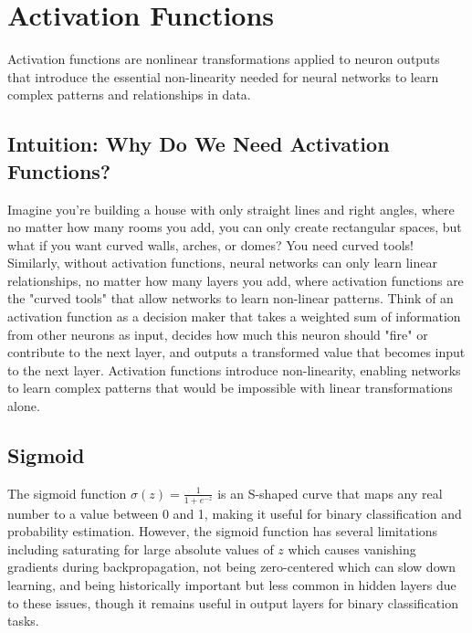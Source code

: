 
\section{Activation Functions }
\label{sec:activation-functions}

Activation functions are nonlinear transformations applied to neuron outputs that introduce the essential non-linearity needed for neural networks to learn complex patterns and relationships in data.

\subsection{Intuition: Why Do We Need Activation Functions?}

Imagine you're building a house with only straight lines and right angles, where no matter how many rooms you add, you can only create rectangular spaces, but what if you want curved walls, arches, or domes? You need curved tools! Similarly, without activation functions, neural networks can only learn linear relationships, no matter how many layers you add, where activation functions are the "curved tools" that allow networks to learn non-linear patterns. Think of an activation function as a decision maker that takes a weighted sum of information from other neurons as input, decides how much this neuron should "fire" or contribute to the next layer, and outputs a transformed value that becomes input to the next layer. Activation functions introduce non-linearity, enabling networks to learn complex patterns that would be impossible with linear transformations alone.

\subsection{Sigmoid}

The sigmoid function $\sigma(z) = \frac{1}{1 + e^{-z}}$ is an S-shaped curve that maps any real number to a value between 0 and 1, making it useful for binary classification and probability estimation. However, the sigmoid function has several limitations including saturating for large absolute values of $z$ which causes vanishing gradients during backpropagation, not being zero-centered which can slow down learning, and being historically important but less common in hidden layers due to these issues, though it remains useful in output layers for binary classification tasks.


